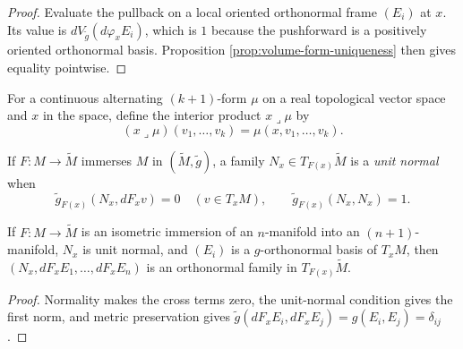 \begin{proof}

\sketch Evaluate the pullback on a local oriented orthonormal frame $(E_i)$ at $x$. Its value is $dV_{\widetilde g}(d\varphi_xE_i)$, which is $1$ because the pushforward is a positively oriented orthonormal basis. Proposition \ref{prop:volume-form-uniqueness} then gives equality pointwise.
\end{proof}

\begin{definition}
\label{def:interior-multiplication}




For a continuous alternating $(k+1)$-form $\mu$ on a real topological vector space and $x$ in the space, define the interior product $x\lrcorner\mu$ by
\[
(x\lrcorner\mu)(v_1,\ldots,v_k)=\mu(x,v_1,\ldots,v_k).
\]
\end{definition}

\begin{definition}
\label{def:unit-normal}





If $F:M\to\widetilde M$ immerses $M$ in $(\widetilde M,\widetilde g)$, a family $N_x\in T_{F(x)}\widetilde M$ is a \emph{unit normal} when
\[
\widetilde g_{F(x)}(N_x,dF_xv)=0\quad(v\in T_xM),\qquad \widetilde g_{F(x)}(N_x,N_x)=1.
\]
\end{definition}

\begin{lemma}
\label{lem:adapted-frame-cons-normal}





If $F:M\to\widetilde M$ is an isometric immersion of an $n$-manifold into an $(n+1)$-manifold, $N_x$ is unit normal, and $(E_i)$ is a $g$-orthonormal basis of $T_xM$, then $(N_x,dF_xE_1,\ldots,dF_xE_n)$ is an orthonormal family in $T_{F(x)}\widetilde M$.
\end{lemma}

\begin{proof}

\sketch Normality makes the cross terms zero, the unit-normal condition gives the first norm, and metric preservation gives $\widetilde g(dF_xE_i,dF_xE_j)=g(E_i,E_j)=\delta_{ij}$.
\end{proof}

